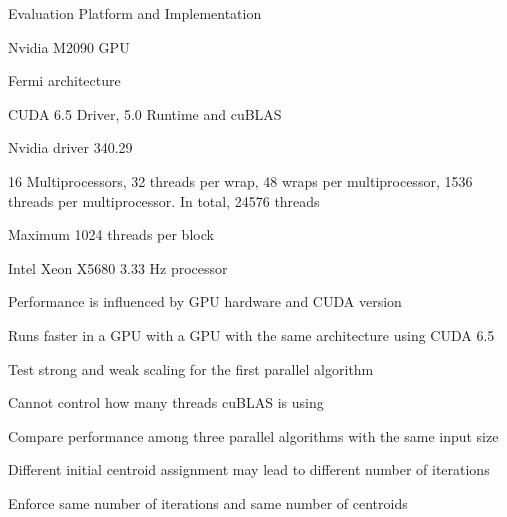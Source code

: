 \documentclass[
nopagebreaks,
style=klope,
fleqn]{powerdot}
\begin{document}
\begin{slide}{Evaluation Platform and Implementation}
  \small
  \begin{compactitem}
  \item{Nvidia M2090 GPU
    \begin{compactitem}
    \item{Fermi architecture}
    \item{CUDA 6.5 Driver, 5.0 Runtime and cuBLAS}
    \item{Nvidia driver 340.29}
    \item{16 Multiprocessors, 32 threads per wrap, 48 wraps per multiprocessor, 1536 threads per
      multiprocessor. In total, 24576 threads}
    \item{Maximum 1024 threads per block}
    \end{compactitem}
  }
  \item{Intel Xeon X5680 3.33 Hz processor}
  \item{Performance is influenced by GPU hardware and CUDA version
    \begin{compactitem}
    \item{Runs faster in a GPU with a GPU with the same architecture using CUDA 6.5}  
    \end{compactitem}
  }
  \item{Test strong and weak scaling for the first parallel algorithm}
  \item{Cannot control how many threads cuBLAS is using
    \begin{compactitem}
    \item{Compare performance among three parallel algorithms with the same input size}
    \end{compactitem}
  }
  \item{Different initial centroid assignment may lead to different number of iterations
    \begin{compactitem}
    \item{Enforce same number of iterations and same number of centroids}
    \end{compactitem}
  }
  \end{compactitem}
\end{slide}
\end{document}
